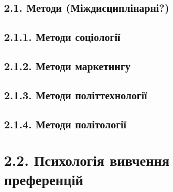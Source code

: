 \documentclass[
  10pt,
  a5paper,
  DIV=11,
  numbers=noendperiod]{scrreprt}
\begin{document}

\subsection*{2.1. Методи
(Міждисциплінарні?)}\label{ux43cux435ux442ux43eux434ux438-ux43cux456ux436ux434ux438ux441ux446ux438ux43fux43bux456ux43dux430ux440ux43dux456}

\subsection*{2.1.1. Методи
соціології}\label{ux43cux435ux442ux43eux434ux438-ux441ux43eux446ux456ux43eux43bux43eux433ux456ux457}

\subsection*{2.1.2. Методи
маркетингу}\label{ux43cux435ux442ux43eux434ux438-ux43cux430ux440ux43aux435ux442ux438ux43dux433ux443}

\subsection*{2.1.3. Методи
політтехнології}\label{ux43cux435ux442ux43eux434ux438-ux43fux43eux43bux456ux442ux442ux435ux445ux43dux43eux43bux43eux433ux456ux457}

\subsection*{2.1.4. Методи
політології}\label{ux43cux435ux442ux43eux434ux438-ux43fux43eux43bux456ux442ux43eux43bux43eux433ux456ux457}

\section*{2.2. Психологія вивчення
преференцій}\label{ux43fux441ux438ux445ux43eux43bux43eux433ux456ux44f-ux432ux438ux432ux447ux435ux43dux43dux44f-ux43fux440ux435ux444ux435ux440ux435ux43dux446ux456ux439}
\end{document}
